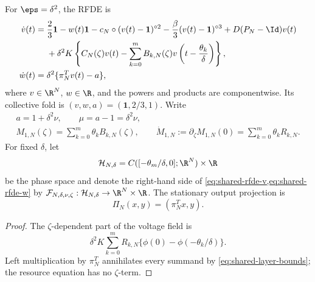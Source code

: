 For \(\eps=\delta^2\), the RFDE is
\begin{align}
 \dot v(t)={}&\frac23\mathbf1-w(t)\mathbf1
 -c_N\circ(v(t)-\mathbf1)^{\circ2}
 -\frac\beta3(v(t)-\mathbf1)^{\circ3}+D(P_N-\Id)v(t)\notag\\
 &+\delta^2K\left\{C_N(\zeta)v(t)
 -\sum_{k=0}^mB_{k,N}(\zeta)
       v\left(t-\frac{\theta_k}{\delta}\right)\right\},
                                                               \label{eq:shared-rfde-v}\\
 \dot w(t)={}&\delta^2\{\pi_N^Tv(t)-a\},             \label{eq:shared-rfde-w}
\end{align}
where \(v\in\R^N\), \(w\in\R\), and the powers and products are
componentwise.  Its collective fold is
\((v,w,a)=(\mathbf1,2/3,1)\).  Write
\begin{equation}
 \begin{gathered}
  a=1+\delta^2\nu,\qquad \mu=a-1=\delta^2\nu,\\
  M_{1,N}(\zeta)=\sum_{k=0}^m\theta_kB_{k,N}(\zeta),\qquad
  \dot M_{1,N}:=\partial_\zeta M_{1,N}(0)
  =\sum_{k=0}^m\theta_kR_{k,N}.
 \end{gathered}                                       \label{eq:shared-parameters}
\end{equation}
For fixed \(\delta\), let
\[
 \mathcal H_{N,\delta}
 =C([-\theta_m/\delta,0];\R^N)\times\R
\]
be the phase space and denote the right-hand side of
\cref{eq:shared-rfde-v,eq:shared-rfde-w} by
\(\mathcal F_{N,\delta,\nu,\zeta}:\mathcal H_{N,\delta}
\to\R^N\times\R\).  The stationary output projection is
\[
 \Pi_N(x,y)=(\pi_N^Tx,y).
\]


\begin{proof}
The \(\zeta\)-dependent part of the voltage field is
\[
 \delta^2K\sum_{k=0}^mR_{k,N}
 \{\phi(0)-\phi(-\theta_k/\delta)\}.
\]
Left multiplication by \(\pi_N^T\) annihilates every summand by
\cref{eq:shared-layer-bounds}; the resource equation has no \(\zeta\)-term.
\end{proof}

